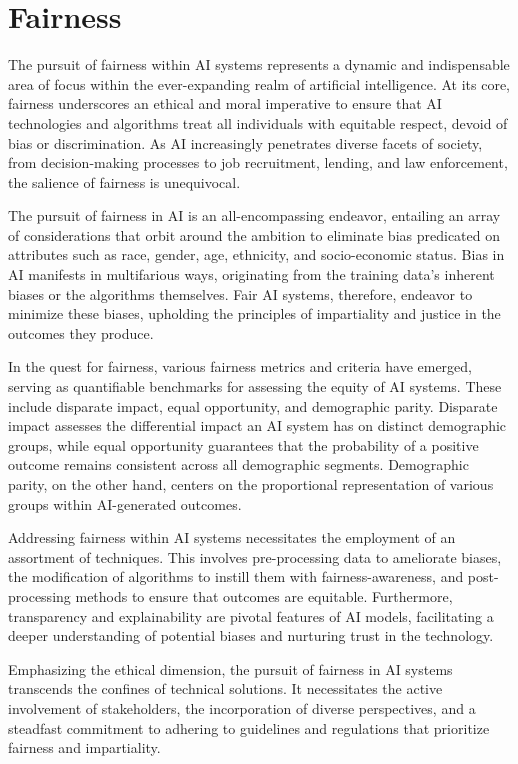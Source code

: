 \documentclass[12pt,a4paper,openright,twoside]{book}
\begin{document}
\section{Fairness} 
The pursuit of fairness within AI systems represents a dynamic and indispensable area of focus within the ever-expanding realm of artificial intelligence. At its core, fairness underscores an ethical and moral imperative to ensure that AI technologies and algorithms treat all individuals with equitable respect, devoid of bias or discrimination. As AI increasingly penetrates diverse facets of society, from decision-making processes to job recruitment, lending, and law enforcement, the salience of fairness is unequivocal. 

The pursuit of fairness in AI is an all-encompassing endeavor, entailing an array of considerations that orbit around the ambition to eliminate bias predicated on attributes such as race, gender, age, ethnicity, and socio-economic status. Bias in AI manifests in multifarious ways, originating from the training data's inherent biases or the algorithms themselves. Fair AI systems, therefore, endeavor to minimize these biases, upholding the principles of impartiality and justice in the outcomes they produce. 

In the quest for fairness, various fairness metrics and criteria have emerged, serving as quantifiable benchmarks for assessing the equity of AI systems. These include disparate impact, equal opportunity, and demographic parity. Disparate impact assesses the differential impact an AI system has on distinct demographic groups, while equal opportunity guarantees that the probability of a positive outcome remains consistent across all demographic segments. Demographic parity, on the other hand, centers on the proportional representation of various groups within AI-generated outcomes. 

Addressing fairness within AI systems necessitates the employment of an assortment of techniques. This involves pre-processing data to ameliorate biases, the modification of algorithms to instill them with fairness-awareness, and post-processing methods to ensure that outcomes are equitable. Furthermore, transparency and explainability are pivotal features of AI models, facilitating a deeper understanding of potential biases and nurturing trust in the technology. 

Emphasizing the ethical dimension, the pursuit of fairness in AI systems transcends the confines of technical solutions. It necessitates the active involvement of stakeholders, the incorporation of diverse perspectives, and a steadfast commitment to adhering to guidelines and regulations that prioritize fairness and impartiality. 
\end{document}
